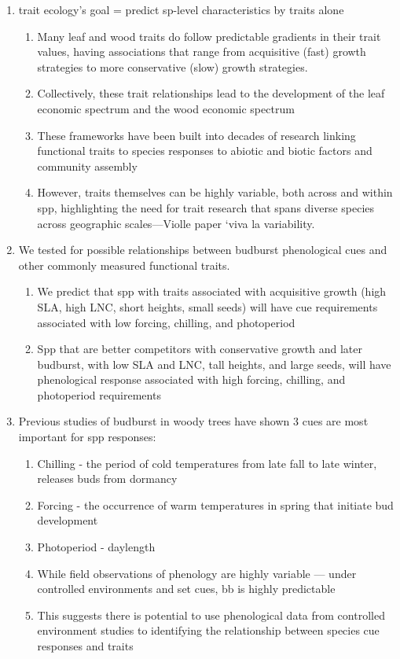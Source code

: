 \documentclass{article}
\begin{document}
\begin{enumerate}
\item trait ecology’s goal = predict sp-level characteristics by traits alone %
\begin{enumerate}
\item Many leaf and wood traits do follow predictable gradients in their trait values, having associations that range from acquisitive (fast) growth strategies to more conservative (slow) growth strategies.
\item Collectively, these trait relationships lead to the development of the leaf economic spectrum and the wood economic spectrum
\item These frameworks have been built into decades of research linking functional traits to species responses to abiotic and biotic factors and community assembly
\item However, traits themselves can be highly variable, both across and within spp, highlighting the need for trait research that spans diverse species across geographic scales---Violle paper ‘viva la variability. 
\end{enumerate}

\item We tested for possible relationships between budburst phenological cues and other commonly measured functional traits.
\begin{enumerate}
\item We predict that spp with traits associated with acquisitive growth (high SLA, high LNC, short heights, small seeds) will have cue requirements associated with low forcing, chilling, and photoperiod
\item Spp that are better competitors with conservative growth and later budburst, with low SLA and LNC, tall heights, and large seeds, will have phenological response associated with high forcing, chilling, and photoperiod requirements
\end{enumerate}

\item Previous studies of budburst in woody trees have shown 3 cues are most important for spp responses:
\begin{enumerate}
\item Chilling - the period of cold temperatures from late fall to late winter, releases buds from dormancy
\item Forcing - the occurrence of warm temperatures in spring that initiate bud development 
\item Photoperiod - daylength
\item While field observations of phenology are highly variable — under controlled environments and set cues, bb is highly predictable
\item This suggests there is potential to use phenological data from controlled environment studies to identifying the relationship between species cue responses and traits
\end{enumerate}


\end{enumerate}
\end{document}

